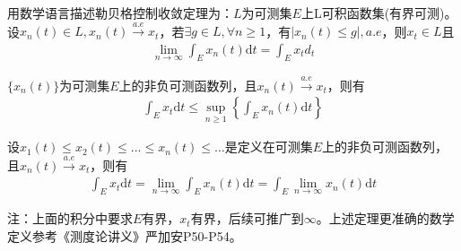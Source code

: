             \par
            用数学语言描述勒贝格控制收敛定理为：$L$为可测集$E$上L可积函数集(有界可测)。设$x_n(t)\in L,x_n(t)\xrightarrow{a.e}x_t$，若$\exists g\in L,\forall n \geqslant 1$，有$|x_n(t) \leqslant g|,a.e$，则$x_t\in L$且
            \begin{align*}
                \lim_{n\rightarrow \infty} \int_Ex_n(t) \mathrm{d}t = \int_E x_td_t
            \end{align*}
            \begin{lemma}[Fatou引理]
            $\{x_n(t)\}$为可测集$E$上的非负可测函数列，且$x_n(t)\xrightarrow{a.e}x_t$，则有
            \begin{align*}
                \int_E x_t \mathrm{d}t \leqslant \sup_{n \geqslant 1}\left\{ \int_E x_n(t) \mathrm{d}t\right\}
            \end{align*}
            \end{lemma}
            \begin{lemma}[Levi引理]
            设$x_1(t) \leqslant x_2(t) \leqslant \dots \leqslant x_n(t) \leqslant \dots$是定义在可测集$E$上的非负可测函数列，且$x_n(t)\xrightarrow{a.e}x_t$，则有
            \begin{align*}
            \int_E x_t \mathrm{d}t  = \lim_{n \rightarrow \infty} \int_E x_n(t) \mathrm{d}t = \int_E \lim_{n \rightarrow \infty} x_n(t) \mathrm{d}t
            \end{align*}
            \end{lemma}
            注：上面的积分中要求$E$有界，$x_t$有界，后续可推广到$\infty$。上述定理更准确的数学定义参考《测度论讲义》严加安P50-P54。

